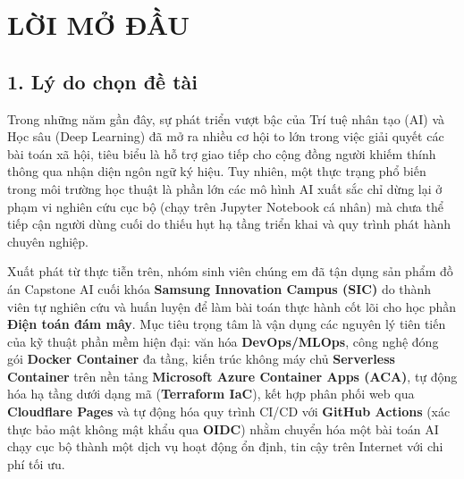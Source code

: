 
\chapter*{LỜI MỞ ĐẦU}

\section*{1. Lý do chọn đề tài}
Trong những năm gần đây, sự phát triển vượt bậc của Trí tuệ nhân tạo (AI) và Học sâu (Deep Learning) đã mở ra nhiều cơ hội to lớn trong việc giải quyết các bài toán xã hội, tiêu biểu là hỗ trợ giao tiếp cho cộng đồng người khiếm thính thông qua nhận diện ngôn ngữ ký hiệu. Tuy nhiên, một thực trạng phổ biến trong môi trường học thuật là phần lớn các mô hình AI xuất sắc chỉ dừng lại ở phạm vi nghiên cứu cục bộ (chạy trên Jupyter Notebook cá nhân) mà chưa thể tiếp cận người dùng cuối do thiếu hụt hạ tầng triển khai và quy trình phát hành chuyên nghiệp.

Xuất phát từ thực tiễn trên, nhóm sinh viên chúng em đã tận dụng sản phẩm đồ án Capstone AI cuối khóa \textbf{Samsung Innovation Campus (SIC)} do thành viên tự nghiên cứu và huấn luyện để làm bài toán thực hành cốt lõi cho học phần \textbf{Điện toán đám mây}. Mục tiêu trọng tâm là vận dụng các nguyên lý tiên tiến của kỹ thuật phần mềm hiện đại: văn hóa \textbf{DevOps/MLOps}, công nghệ đóng gói \textbf{Docker Container} đa tầng, kiến trúc không máy chủ \textbf{Serverless Container} trên nền tảng \textbf{Microsoft Azure Container Apps (ACA)}, tự động hóa hạ tầng dưới dạng mã (\textbf{Terraform IaC}), kết hợp phân phối web qua \textbf{Cloudflare Pages} và tự động hóa quy trình CI/CD với \textbf{GitHub Actions} (xác thực bảo mật không mật khẩu qua \textbf{OIDC}) nhằm chuyển hóa một bài toán AI chạy cục bộ thành một dịch vụ hoạt động ổn định, tin cậy trên Internet với chi phí tối ưu.

